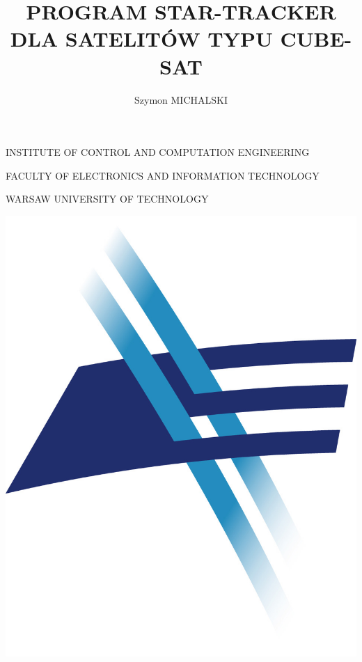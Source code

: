 \documentclass[12pt,a4paper,oneside]{article}
\author{Szymon MICHALSKI}
\title{PROGRAM STAR-TRACKER DLA SATELITÓW TYPU CUBE-SAT}
\begin{document}

\begin{titlepage}
	\centering

	INSTITUTE OF CONTROL AND COMPUTATION ENGINEERING\par
	FACULTY OF ELECTRONICS AND INFORMATION TECHNOLOGY\par
	WARSAW UNIVERSITY OF TECHNOLOGY\par
	\vspace{0.5cm}
	\includegraphics[scale=0.3]{logo_WEiTI.jpg}
	\hspace{1cm}

\end{titlepage}
\end{document}

